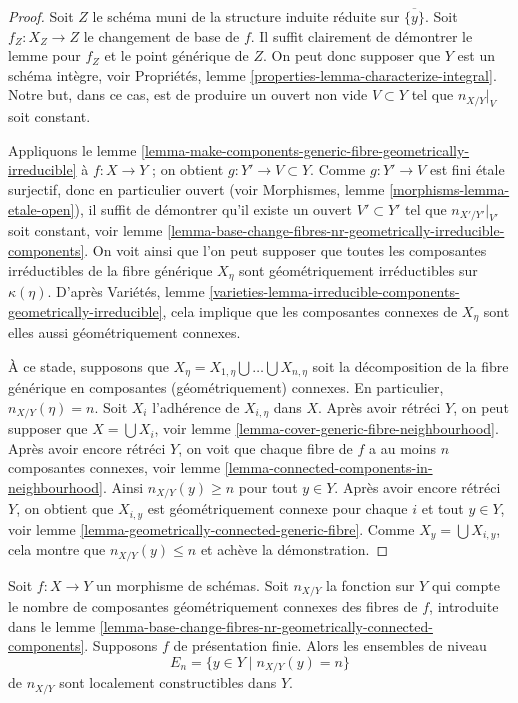 \begin{proof}
Soit $Z$ le schéma muni de la structure induite réduite sur $\overline{\{y\}}$.
Soit $f_Z : X_Z \to Z$ le changement de base de $f$. Il suffit clairement de démontrer
le lemme pour $f_Z$ et le point générique de $Z$. On peut donc supposer que
$Y$ est un schéma intègre, voir
Propriétés, lemme \ref{properties-lemma-characterize-integral}.
Notre but, dans ce cas, est de produire un ouvert non vide $V \subset Y$ tel que
$n_{X/Y}|_V$ soit constant.

\medskip\noindent
Appliquons le
lemme \ref{lemma-make-components-generic-fibre-geometrically-irreducible}
à $f : X \to Y$ ; on obtient $g : Y' \to V \subset Y$. Comme $g : Y' \to V$ est
fini étale surjectif, donc en particulier ouvert (voir
Morphismes, lemme \ref{morphisms-lemma-etale-open}),
il suffit de démontrer qu'il existe un ouvert $V' \subset Y'$
tel que $n_{X'/Y'}|_{V'}$ soit constant, voir
lemme \ref{lemma-base-change-fibres-nr-geometrically-irreducible-components}.
On voit ainsi que l'on peut supposer que toutes les composantes irréductibles de
la fibre générique $X_\eta$ sont géométriquement irréductibles sur $\kappa(\eta)$.
D'après
Variétés, lemme
\ref{varieties-lemma-irreducible-components-geometrically-irreducible},
cela implique que les composantes connexes de $X_\eta$ sont elles aussi
géométriquement connexes.

\medskip\noindent
À ce stade, supposons que
$X_\eta = X_{1, \eta} \bigcup \ldots \bigcup X_{n, \eta}$
soit la décomposition de la fibre générique en composantes
(géométriquement) connexes.
En particulier, $n_{X/Y}(\eta) = n$.
Soit $X_i$ l'adhérence de
$X_{i, \eta}$ dans $X$. Après avoir rétréci $Y$, on peut supposer que
$X = \bigcup X_i$, voir
lemme \ref{lemma-cover-generic-fibre-neighbourhood}.
Après avoir encore rétréci $Y$, on voit que chaque fibre de
$f$ a au moins $n$ composantes connexes, voir
lemme \ref{lemma-connected-components-in-neighbourhood}.
Ainsi $n_{X/Y}(y) \geq n$ pour tout $y \in Y$.
Après avoir encore rétréci $Y$, on obtient que $X_{i, y}$
est géométriquement connexe pour chaque $i$ et tout $y \in Y$, voir
lemme \ref{lemma-geometrically-connected-generic-fibre}.
Comme $X_y = \bigcup X_{i, y}$,
cela montre que $n_{X/Y}(y) \leq n$ et achève la démonstration.
\end{proof}

\begin{lemma}
\label{lemma-nr-geom-connected-components-constructible}
Soit $f : X \to Y$ un morphisme de schémas. Soit
$n_{X/Y}$ la fonction sur $Y$ qui compte le nombre de composantes
géométriquement connexes des fibres de $f$, introduite dans le
lemme \ref{lemma-base-change-fibres-nr-geometrically-connected-components}.
Supposons $f$ de présentation finie. Alors les ensembles de niveau
$$
E_n = \{y \in Y \mid n_{X/Y}(y) = n\}
$$
de $n_{X/Y}$ sont localement constructibles dans $Y$.
\end{lemma}

